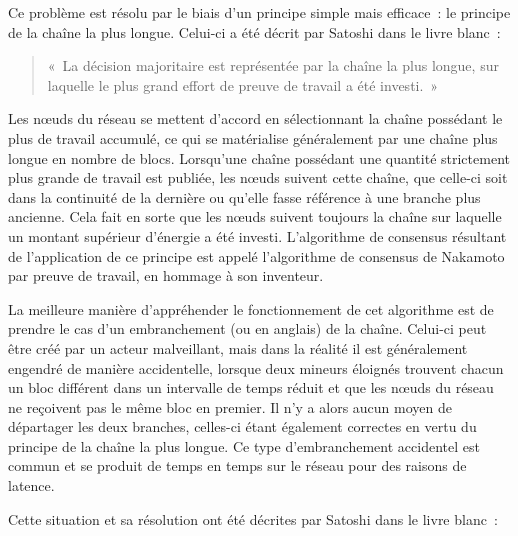 
Ce problème est résolu par le biais d'un principe simple mais efficace~: le principe de la chaîne la plus longue. Celui-ci a été décrit par Satoshi dans le livre blanc~: 

\begin{quote}
«~La décision majoritaire est représentée par la chaîne la plus longue, sur laquelle le plus grand effort de preuve de travail a été investi.~»
\end{quote}

Les nœuds du réseau se mettent d'accord en sélectionnant la chaîne possédant le plus de travail accumulé, ce qui se matérialise généralement par une chaîne plus longue en nombre de blocs. Lorsqu'une chaîne possédant une quantité strictement plus grande de travail est publiée, les nœuds suivent cette chaîne, que celle-ci soit dans la continuité de la dernière ou qu'elle fasse référence à une branche plus ancienne. Cela fait en sorte que les nœuds suivent toujours la chaîne sur laquelle un montant supérieur d'énergie a été investi. L'algorithme de consensus résultant de l'application de ce principe est appelé l'algorithme de consensus de Nakamoto par preuve de travail, en hommage à son inventeur.


La meilleure manière d'appréhender le fonctionnement de cet algorithme est de prendre le cas d'un embranchement (ou  en anglais) de la chaîne. Celui-ci peut être créé par un acteur malveillant, mais dans la réalité il est généralement engendré de manière accidentelle, lorsque deux mineurs éloignés trouvent chacun un bloc différent dans un intervalle de temps réduit et que les nœuds du réseau ne reçoivent pas le même bloc en premier. Il n'y a alors aucun moyen de départager les deux branches, celles-ci étant également correctes en vertu du principe de la chaîne la plus longue. Ce type d'embranchement accidentel est commun et se produit de temps en temps sur le réseau pour des raisons de latence.

Cette situation et sa résolution ont été décrites par Satoshi dans le livre blanc~:

